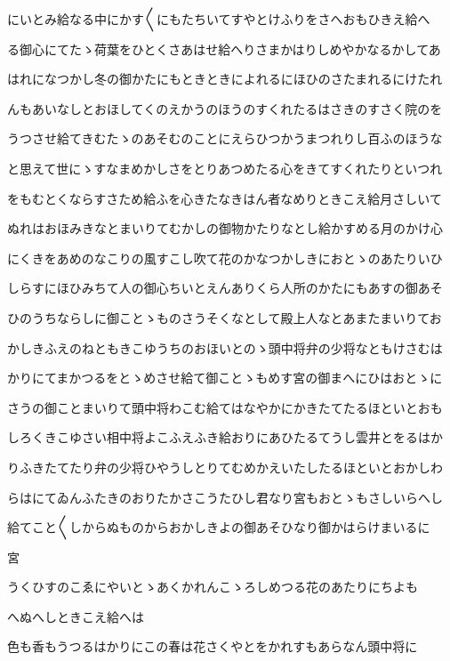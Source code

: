 \documentclass[a4paper,11pt,landscape]{ltjtarticle}
\begin{document}
にいとみ給なる中にかす〱にもたちいてすやとけふりをさへおもひきえ給へ
\par\medskip
る御心にてたゝ荷葉をひとくさあはせ給へりさまかはりしめやかなるかしてあ
\par\medskip
はれになつかし冬の御かたにもときときによれるにほひのさたまれるにけたれ
\par\medskip
んもあいなしとおほしてくのえかうのほうのすくれたるはさきのすさく院のを
\par\medskip
うつさせ給てきむたゝのあそむのことにえらひつかうまつれりし百ふのほうな
\par\medskip
と思えて世にゝすなまめかしさをとりあつめたる心をきてすくれたりといつれ
\par\medskip
をもむとくならすさため給ふを心きたなきはん者なめりときこえ給月さしいて
\par\medskip
ぬれはおほみきなとまいりてむかしの御物かたりなとし給かすめる月のかけ心
\par\medskip
にくきをあめのなこりの風すこし吹て花のかなつかしきにおとゝのあたりいひ
\par\medskip
しらすにほひみちて人の御心ちいとえんありくら人所のかたにもあすの御あそ
\par\medskip
ひのうちならしに御ことゝものさうそくなとして殿上人なとあまたまいりてお
\par\medskip
かしきふえのねともきこゆうちのおほいとのゝ頭中将弁の少将なともけさむは
\par\medskip
かりにてまかつるをとゝめさせ給て御ことゝもめす宮の御まへにひはおとゝに
\par\medskip
さうの御ことまいりて頭中将わこむ給てはなやかにかきたてたるほといとおも
\par\medskip
しろくきこゆさい相中将よこふえふき給おりにあひたるてうし雲井とをるはか
\par\medskip
りふきたてたり弁の少将ひやうしとりてむめかえいたしたるほといとおかしわ
\par\medskip
らはにてゐんふたきのおりたかさこうたひし君なり宮もおとゝもさしいらへし
\par\medskip
給てこと〱しからぬものからおかしきよの御あそひなり御かはらけまいるに
\par\medskip
宮
\par\medskip
うくひすのこゑにやいとゝあくかれんこゝろしめつる花のあたりにちよも
\par\medskip
へぬへしときこえ給へは
\par\medskip
色も香もうつるはかりにこの春は花さくやとをかれすもあらなん頭中将に
\par\medskip
\end{document}
